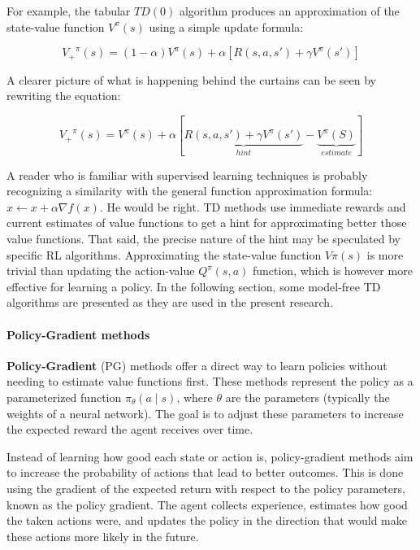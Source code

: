 For example, the tabular $TD(0)$ algorithm produces an approximation of the state-value function $V^\pi(s)$ using a simple update formula:

\begin{equation} \label{eq:TD0-update}
  {V_+}^\pi(s) = (1 - \alpha) V^\pi(s) + \alpha \left[ R(s, a, s') + \gamma V^\pi(s') \right]
\end{equation}

A clearer picture of what is happening behind the curtains can be seen by rewriting the equation:

\begin{equation} \label{eq:TD0-update-rewritten}
  {V_+}^\pi(s) = V^\pi(s) + \alpha \left[ \underbrace{R(s, a, s') + \gamma V^\pi(s')}_{hint} - \underbrace{V^\pi(S)}_{estimate} \right]
\end{equation}

A reader who is familiar with supervised learning techniques is probably recognizing a similarity with the general function approximation formula: $x \leftarrow x + \alpha \nabla f(x)$.
He would be right. TD methods use immediate rewards and current estimates of value functions to get a hint for approximating better those value functions.
That said, the precise nature of the hint may be speculated by specific RL algorithms. Approximating the state-value function $V\pi(s)$ is more trivial than updating the action-value $Q^\pi(s, a)$ function, which is however more effective for learning a policy. In the following section, some model-free TD algorithms are presented as they are used in the present research.

\paragraph{Policy-Gradient methods}

\textbf{Policy-Gradient} (PG) \cite{sutton1999policy} methods offer a direct way to learn policies without needing to estimate value functions first. These methods represent the policy as a parameterized function $\pi_\theta(a \mid s)$, where $\theta$ are the parameters (typically the weights of a neural network). The goal is to adjust these parameters to increase the expected reward the agent receives over time.

Instead of learning how good each state or action is, policy-gradient methods aim to increase the probability of actions that lead to better outcomes. This is done using the gradient of the expected return with respect to the policy parameters, known as the policy gradient. The agent collects experience, estimates how good the taken actions were, and updates the policy in the direction that would make these actions more likely in the future.

